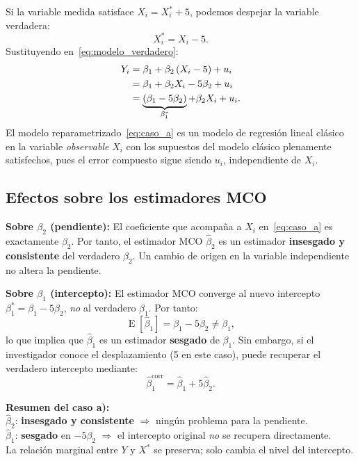 \documentclass[12pt, letterpaper]{article}
\newcommand{\E}{\operatorname{E}}
\begin{document}
Si la variable medida satisface $X_i = X_i^* + 5$, podemos despejar la
variable verdadera:
\[
  X_i^* = X_i - 5.
\]
Sustituyendo en~\eqref{eq:modelo_verdadero}:
\begin{align}
  Y_i &= \beta_1 + \beta_2\,(X_i - 5) + u_i \notag\\
      &= \beta_1 + \beta_2 X_i - 5\beta_2 + u_i \notag\\
      &= \underbrace{(\beta_1 - 5\beta_2)}_{\beta_1^*} + \beta_2 X_i + u_i.
  \label{eq:caso_a}
\end{align}
El modelo reparametrizado~\eqref{eq:caso_a} es un modelo de regresión
lineal clásico en la variable \emph{observable} $X_i$ con los supuestos
del modelo clásico plenamente satisfechos, pues el error compuesto sigue
siendo $u_i$, independiente de $X_i$.

\subsection{Efectos sobre los estimadores MCO}

\textbf{Sobre $\beta_2$ (pendiente):} El coeficiente que acompaña a $X_i$
en~\eqref{eq:caso_a} es exactamente $\beta_2$. Por tanto, el estimador
MCO $\hat{\beta}_2$ es un estimador \textbf{insesgado y consistente} del
verdadero $\beta_2$. Un cambio de origen en la variable independiente no
altera la pendiente.

\textbf{Sobre $\beta_1$ (intercepto):} El estimador MCO converge al nuevo
intercepto $\beta_1^* = \beta_1 - 5\beta_2$, \emph{no} al verdadero
$\beta_1$. Por tanto:
\[
  \E[\hat{\beta}_1] = \beta_1 - 5\beta_2 \neq \beta_1,
\]
lo que implica que $\hat{\beta}_1$ es un estimador \textbf{sesgado} de
$\beta_1$. Sin embargo, si el investigador conoce el desplazamiento (5 en
este caso), puede recuperar el verdadero intercepto mediante:
\[
  \hat{\beta}_1^{\text{corr}} = \hat{\beta}_1 + 5\hat{\beta}_2.
\]

\begin{clave}
  \textbf{Resumen del caso a):}\\
  $\hat{\beta}_2$: \textbf{insesgado y consistente} $\Rightarrow$ ningún
  problema para la pendiente.\\
  $\hat{\beta}_1$: \textbf{sesgado} en $-5\beta_2$ $\Rightarrow$ el
  intercepto original \emph{no} se recupera directamente.\\
  La relación marginal entre $Y$ y $X^*$ se preserva; solo cambia el nivel
  del intercepto.
\end{clave}
\end{document}

